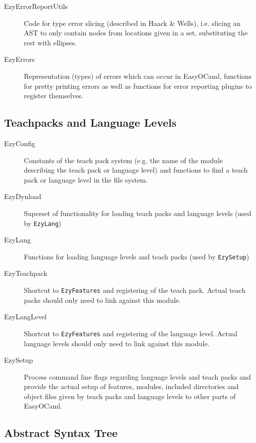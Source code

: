 \begin{description}
    \item[EzyErrorReportUtils] Code for type error slicing 
        (described in Haack \& Wells), i.e. slicing an AST to only 
        contain nodes from locations given in a set, substituting the 
        rest with ellipses.
    \item[EzyErrors] Representation (types) of errors which can 
        occur in EasyOCaml, functions for pretty printing errors as well 
        as functions for error reporting plugins to register themselves.
\end{description}


\subsection{Teachpacks and Language Levels}

\begin{description}
    \item[EzyConfig] Constants of the teach pack system (e.g. the 
        name of the module describing the teach pack or language level) 
        and functions to find a teach pack or language level in the file 
        system.
    \item[EzyDynload] Superset of functionality for loading teach 
        packs and language levels (used by \texttt{EzyLang})
    \item[EzyLang] Functions for loading language levels and teach 
        packs (used by \texttt{EzySetup})
    \item[EzyTeachpack] Shortcut to \texttt{EzyFeatures} and 
        registering of the teach pack.  Actual teach packs should only 
        need to link against this module.
    \item[EzyLangLevel] Shortcut to \texttt{EzyFeatures} and 
        registering of the language level.  Actual language levels 
        should only need to link against this module.
    \item[EzySetup] Process command line flags regarding language 
        levels and teach packs and provide the actual setup of features, 
        modules, included directories and object files given by teach 
        packs and language levels to other parts of EasyOCaml.
\end{description}


\subsection{Abstract Syntax Tree}

